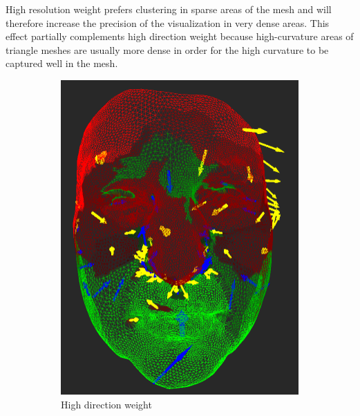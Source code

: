 High resolution weight prefers clustering in sparse areas of the mesh and will therefore increase the precision of the visualization in very dense areas. This effect partially complements high direction weight because high-curvature areas of triangle meshes are usually more dense in order for the high curvature to be captured well in the mesh.

\begin{figure}[h]
\centering
	\begin{subfigure}{0.3\textwidth}
	\includegraphics[width=\textwidth]{./img/meshdiff-high_direction.PNG}
	\caption{High direction weight}
	\label{fig:meshdiff_high_direction}
	\end{subfigure}
    \qquad
    \begin{subfigure}{0.3\textwidth}

\end{subfigure}
\end{figure}

